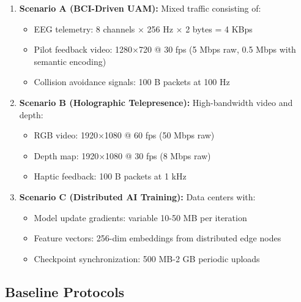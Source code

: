 \documentclass{BVP_CINC}
\begin{document}
\begin{enumerate}
    \item \textbf{Scenario A (BCI-Driven UAM):} Mixed traffic consisting of:
    \begin{itemize}
        \item EEG telemetry: 8 channels $\times$ 256 Hz $\times$ 2 bytes = 4 KBps
        \item Pilot feedback video: 1280$\times$720 @ 30 fps (5 Mbps raw, 0.5 Mbps with semantic encoding)
        \item Collision avoidance signals: 100 B packets at 100 Hz
    \end{itemize}
    \item \textbf{Scenario B (Holographic Telepresence):} High-bandwidth video and depth:
    \begin{itemize}
        \item RGB video: 1920$\times$1080 @ 60 fps (50 Mbps raw)
        \item Depth map: 1920$\times$1080 @ 30 fps (8 Mbps raw)
        \item Haptic feedback: 100 B packets at 1 kHz  
    \end{itemize}
    \item \textbf{Scenario C (Distributed AI Training):} Data centers with:
    \begin{itemize}
        \item Model update gradients: variable 10-50 MB per iteration
        \item Feature vectors: 256-dim embeddings from distributed edge nodes
        \item Checkpoint synchronization: 500 MB-2 GB periodic uploads
    \end{itemize}
\end{enumerate}

\subsection{Baseline Protocols}
\end{document}
